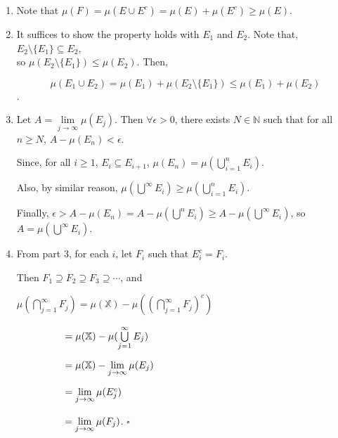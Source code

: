 \documentclass[12pt]{article}
\begin{document}
\begin{enumerate}
    \item Note that $\mu(F) = \mu(E \cup E^c) = \mu(E) + \mu(E^c) \geq \mu(E)$.

    \item It suffices to show the property holds with $E_1$ and $E_2$.
        Note that, $E_2 \setminus \{E_1\} \subseteq E_2$, \\so $\mu(E_2 \setminus \{E_1\}) \le \mu(E_2)$. Then, 

        $$\mu(E_1 \cup E_2) = \mu(E_1) + \mu(E_2 \setminus \{E_1\}) \le \mu(E_1) + \mu(E_2)$$.

    \item Let $A = \lim\limits_{j\rightarrow\infty}\mu(E_j)$. Then $\forall \epsilon > 0$, there exists $N \in\mathbb{N}$ such that for all $n \geq N$, $A - \mu(E_n) < \epsilon$.

    Since, for all $i \geq 1$, $E_i \subseteq E_{i+1}$, $\mu(E_n) = \mu(\bigcup\limits_{i=1}^{n}E_i)$.

    Also, by similar reason, $\mu(\bigcup\limits^{\infty} E_i) \geq \mu(\bigcup\limits_{i=1}^{n}E_i)$.

    Finally, $\epsilon > A - \mu(E_n) = A - \mu(\bigcup\limits^{n}E_i) \geq A - \mu(\bigcup\limits^{\infty} E_i)$, so $A = \mu(\bigcup\limits^{\infty} E_i)$.

    \item From part 3, for each $i$, let $F_i$ such that $E_i^c = F_i$.

    Then $F_1\supseteq F_2\supseteq F_3\supseteq\cdots$, and

    $\mu(\bigcap \limits_{j=1}^\infty F_j) = \mu(\mathbb{X}) - \mu((\bigcap \limits_{j=1}^\infty F_j)^c)$

    $\hspace{1.7cm}= \mu(\mathbb{X})-\mu(\bigcup \limits_{j=1}^\infty E_j)$

    $\hspace{1.7cm}= \mu(\mathbb{X}) - \lim\limits_{j\rightarrow\infty}\mu(E_j)$

    $\hspace{1.7cm}= \lim\limits_{j\rightarrow\infty}\mu(E_j^c) $

    $\hspace{1.7cm}= \lim\limits_{j\rightarrow\infty}\mu(F_j)$. $\square$
\end{enumerate}
\end{document}
